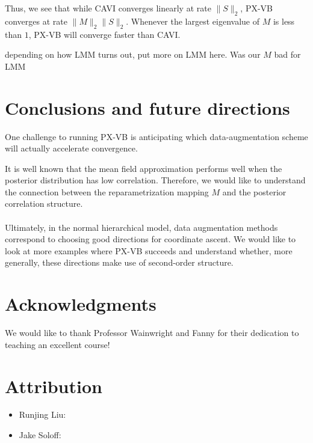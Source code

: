 \documentclass{article}
\begin{document}
Thus, we see that while CAVI converges linearly at rate $\|S\|_2$, PX-VB converges at rate $\|M\|_2\|S\|_2$. Whenever the largest eigenvalue of $M$ is less than $1$, PX-VB will converge faster than CAVI. 

{\color{red} depending on how LMM turns out, put more on LMM here. Was our $M$ bad for LMM} 




\section{Conclusions and future directions} 
One challenge to running PX-VB is anticipating which data-augmentation scheme will actually accelerate convergence. 

It is well known that the mean field approximation performs well when the posterior distribution has low correlation. Therefore, we would like to understand the connection between the reparametrization mapping $M$ and the posterior correlation structure. ~\\~\\

Ultimately, in the normal hierarchical model, data augmentation methods correspond to choosing good directions for coordinate ascent. We would like to look at more examples where PX-VB succeeds and understand whether, more generally, these directions make use of second-order structure.


\newpage

\section*{Acknowledgments}
We would like to thank Professor Wainwright and Fanny for their dedication to teaching an excellent course! %

\section*{Attribution}
\begin{itemize}
\item Runjing Liu: 
\item Jake Soloff: 
\end{itemize}
\end{document}
